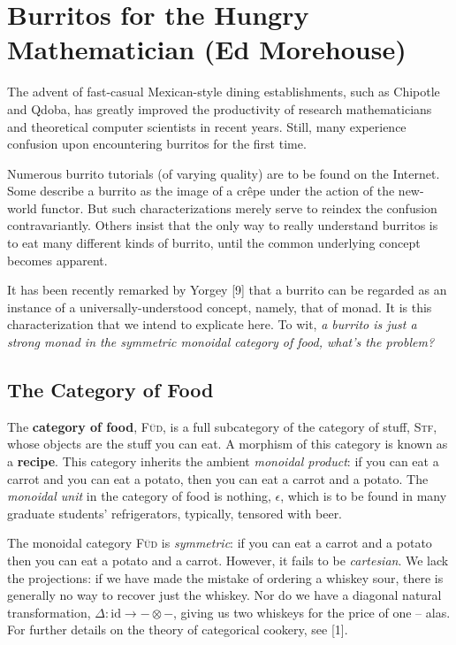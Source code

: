 \documentclass[10pt,twoside,openleft]{memoir}
\begin{document}
\chapter{Burritos for the Hungry Mathematician (Ed Morehouse)}

The advent of fast-casual Mexican-style dining establishments, such as
Chipotle and Qdoba, has greatly improved the productivity of research
mathematicians and theoretical computer scientists in recent years. Still,
many experience confusion upon encountering burritos for the first time.

Numerous burrito tutorials (of varying quality) are to be found on
the Internet. Some describe a burrito as the image of a crêpe under the
action of the new-world functor. But such characterizations merely serve
to reindex the confusion contravariantly. Others insist that the only way
to really understand burritos is to eat many different kinds of burrito,
until the common underlying concept becomes apparent.

It has been recently remarked by Yorgey [9] that a burrito can be
regarded as an instance of a universally-understood concept, namely, that
of monad. It is this characterization that we intend to explicate here. To
wit, \textit{a burrito is just a strong monad in the symmetric monoidal category
of food, what's the problem?}

\section{The Category of Food}

The \textbf{category of food}, \textsc{F\"ud}, is a full subcategory of the category of stuff, \textsc{Stf},
whose objects are the stuff you can eat. A morphism of this category is known
as a \textbf{recipe}. This category inherits the ambient \textit{monoidal product}: if you can
eat a carrot and you can eat a potato, then you can eat a carrot and a potato.
The \textit{monoidal unit} in the category of food is nothing, $\epsilon$, which is to be found in
many graduate students’ refrigerators, typically, tensored with beer.

The monoidal category \textsc{F\"ud} is \textit{symmetric}: if you can eat a carrot and a
potato then you can eat a potato and a carrot. However, it fails to be \textit{cartesian}.
We lack the projections: if we have made the mistake of ordering a whiskey
sour, there is generally no way to recover just the whiskey. Nor do we have a
diagonal natural transformation, $\Delta : \textrm{id} \rightarrow - \otimes -$, giving us two whiskeys for
the price of one -- alas. For further details on the theory of categorical cookery,
see [1].
\end{document}
